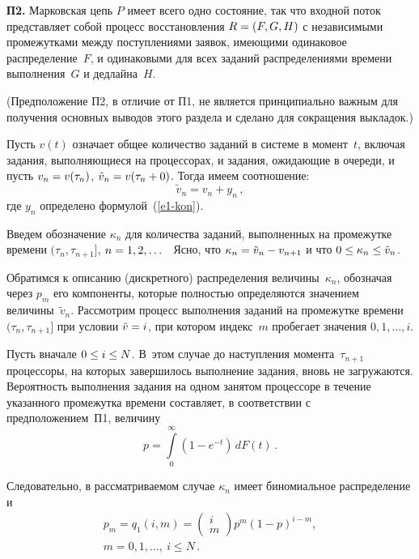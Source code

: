 \begin{multicols}{2}
  \smallskip
  
  \noindent
  \textbf{П2.} Марковская цепь $P$ имеет всего одно состояние, так что входной поток 
представляет собой процесс восстановления $R\hm=(F,G,H)$ с независимыми 
промежутками между поступлениями заявок, имеющими одинаковое распределение~$F$, 
и одинаковыми для всех заданий распределениями времени выполнения~$G$ и 
дедлайна~$H$.
  
  (Предположение П2, в отличие от П1, не является принципиально важным для 
получения основных выводов этого раздела и сделано для сокращения выкладок.)
  
  \smallskip
  
  Пусть $v(t)$ означает общее количество заданий в системе в момент~$t$, включая 
задания, выполняющиеся на процессорах, и задания, ожидающие в очереди, и пусть 
$v_n\hm=v(\tau_n)$, $\tilde{v}_n\hm=v(\tau_n\hm+0)$. Тогда имеем соотношение:
  $$
  \tilde{v}_n=v_n+y_n\,,
  $$
где $y_n$ определено формулой~(\ref{e1-kon}).

  Введем обозначение $\kappa_n$ для количества заданий, выполненных на промежутке 
времени  $(\tau_n,\tau_{n+1}]$, $n\hm=1,2,\ldots$\ \ Ясно, что $\kappa_n\hm=\tilde{v}_n\hm-
v_{n+1}$ и что $0\hm\leq \kappa_n\hm\leq \tilde{v}_n$.
  
  Обратимся к описанию (дискретного) распределения величины~$\kappa_n$, обозначая 
через $p_m$ его компонен\-ты, которые полностью определяются значением 
величины~$\tilde{v}_n$. Рассмотрим процесс выполнения заданий на промежутке 
времени $(\tau_n,\tau_{n+1}]$ при условии $\tilde{v}\hm=i$, при котором индекс~$m$ 
пробегает значения $0,1,\ldots , i$.
  
  Пусть вначале $0\hm\leq i\hm\leq N$. В~этом случае до наступления 
момента~$\tau_{n+1}$ процессоры, на которых завершилось выполнение задания, вновь 
не загружаются. Вероятность выполнения задания на одном занятом процессоре в течение 
указанного промежутка времени составляет, в соответствии с предположением~П1, 
величину
  $$
  p=\int\limits_0^\infty (1-e^{-t})\,dF(t)\,.
  $$
  
  Следовательно, в рассматриваемом случае $\kappa_n$ имеет биномиальное 
распределение и
  \begin{multline}
  p_m =q_1(i,m) =\begin{pmatrix}
  i\\ m\end{pmatrix} p^m (1-p)^{i-m},\\
   m=0,1,\ldots, \ i\leq N\,.
  \label{e3-kon}
  \end{multline}
    

\end{multicols}
